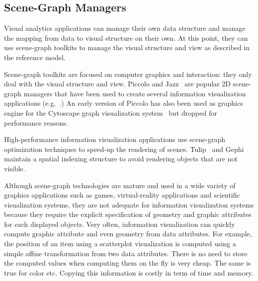 
\subsection{Scene-Graph Managers}

Visual analytics applications can manage their own data structure and
manage the mapping from data to visual structure on their own.  At
this point, they can use scene-graph toolkits to manage the
visual structure and view as described in the reference model.

Scene-graph toolkits are focused on computer graphics and interaction:
they only deal with the visual structure and view.  Piccolo and
Jazz~\cite{Polylithic} are popular 2D scene-graph managers that have
been used to create several information visualization applications
(e.g.~\cite{SpaceTree,Geneaquilt}.) An early version of Piccolo has
also been used as graphics engine for the Cytoscape graph
visualization system~\cite{Cytoscape} but dropped for performance
reasons.

High-performance information visualization applications use
scene-graph optimization techniques to speed-up the rendering of
scenes.  Tulip~\cite{Tulip} and Gephi~\cite{Gephi} maintain a spatial
indexing structure to avoid rendering objects that are not visible.

Although scene-graph technologies are mature and used in a wide
variety of graphics applications such as games, virtual-reality
applications and scientific visualization systems, they are not
adequate for information visualization systems because they require
the explicit specification of geometry and graphic attributes for each
displayed objects.  Very often, information visualization can quickly
compute graphic attribute and even geometry from data attributes.  For
example, the position of an item using a scatterplot visualization is
computed using a simple affine transformation from two data
attributes.  There is no need to store the computed values when
computing them on the fly is very cheap.  The same is true for color
etc.  Copying this information is costly in term of time and memory.

